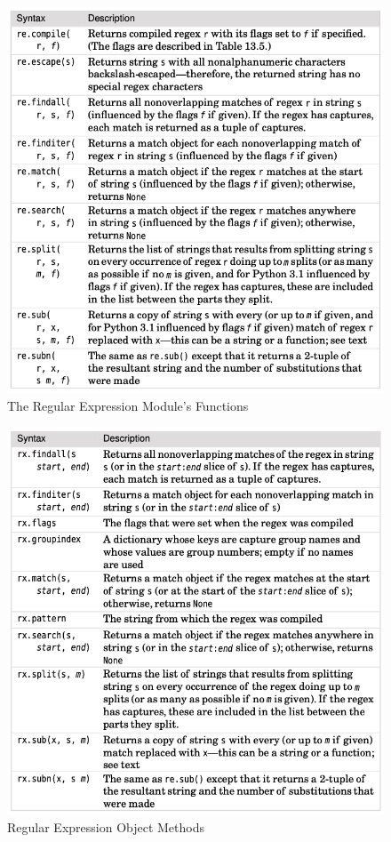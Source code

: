 \begin{figure}[!ht]
  \centering
  \includegraphics[width=\textwidth]{pics/regex-first-way}
  \caption{The Regular Expression Module’s Functions}
  \label{fig:regex-first-way}
\end{figure}


\begin{figure}[!ht]
  \centering
  \includegraphics[width=\textwidth]{pics/regex-second-way}
  \caption{Regular Expression Object Methods}
  \label{fig:regex-second-way}
\end{figure}


